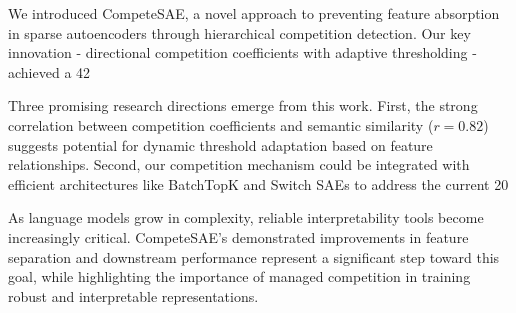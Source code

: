 \documentclass{article} %
\begin{document}
We introduced CompeteSAE, a novel approach to preventing feature absorption in sparse autoencoders through hierarchical competition detection. Our key innovation - directional competition coefficients with adaptive thresholding - achieved a 42%

Three promising research directions emerge from this work. First, the strong correlation between competition coefficients and semantic similarity ($r=0.82$) suggests potential for dynamic threshold adaptation based on feature relationships. Second, our competition mechanism could be integrated with efficient architectures like BatchTopK and Switch SAEs to address the current 20%

As language models grow in complexity, reliable interpretability tools become increasingly critical. CompeteSAE's demonstrated improvements in feature separation and downstream performance represent a significant step toward this goal, while highlighting the importance of managed competition in training robust and interpretable representations.



\end{document}
